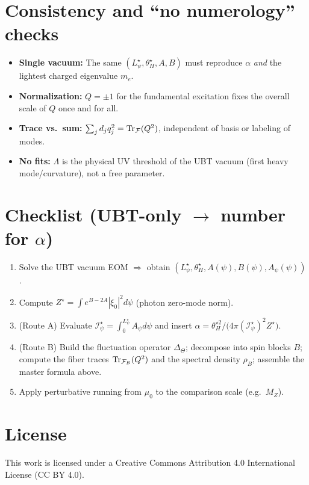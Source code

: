 \documentclass[12pt]{article}
\begin{document}
\section{Consistency and ``no numerology'' checks}
\begin{itemize}
\item \textbf{Single vacuum:} The same $(L_\psi^\star,\theta_H^\star,A,B)$ must reproduce $\alpha$ \emph{and} the lightest charged eigenvalue $m_e$.
\item \textbf{Normalization:} $Q=\pm1$ for the fundamental excitation fixes the overall scale of $Q$ once and for all.
\item \textbf{Trace vs.\ sum:} $\sum_j d_j q_j^2 = \Tr_{\mathcal F}(Q^2)$, independent of basis or labeling of modes.
\item \textbf{No fits:} $\Lambda$ is the physical UV threshold of the UBT vacuum (first heavy mode/curvature), not a free parameter.
\end{itemize}

\section*{Checklist (UBT-only $\to$ number for $\alpha$)}
\begin{enumerate}
\item Solve the UBT vacuum EOM $\Rightarrow$ obtain $(L_\psi^\star,\theta_H^\star,A(\psi),B(\psi),A_\psi(\psi))$.
\item Compute $Z^\star=\int e^{B-2A}|\xi_0|^2 d\psi$ (photon zero-mode norm).
\item (Route A) Evaluate $\mathcal I_\psi^\star=\int_0^{L_\psi^\star}\! A_\psi d\psi$ and insert
$\alpha=\theta_H^{\star 2}/\big(4\pi(\mathcal I_\psi^\star)^2 Z^\star\big)$.
\item (Route B) Build the fluctuation operator $\Delta_\Theta$; decompose into spin blocks $B$; compute the fiber traces $\Tr_{\mathcal F_B}(Q^2)$ and the spectral density $\rho_B$; assemble the master formula above.
\item Apply perturbative running from $\mu_0$ to the comparison scale (e.g.\ $M_Z$).
\end{enumerate}


\section*{License}
This work is licensed under a Creative Commons Attribution 4.0 International License (CC BY 4.0).
\end{document}
